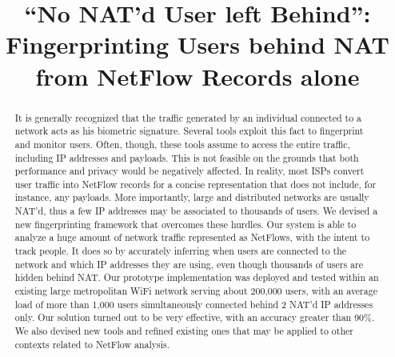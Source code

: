 \documentclass[10pt,conference,compsocconf,letterpaper]{IEEEtran}
\begin{document}
\newtheorem{definition}{Definition}
\newcommand{\nfr}[0]{\textit{nfr}}
\newcommand{\netport}[0]{}
\newcommand{\fkey}[0]{\ensuremath{f_{\textit{key}}}}

\renewenvironment{description}[1][10pt]
  {\list{}{\labelwidth=0pt \leftmargin=#1
   \let\makelabel\descriptionlabel}}
  {\endlist}

\author{
}

\title{``No NAT'd User left Behind'': Fingerprinting Users behind NAT from NetFlow Records alone}

\maketitle
\begin{abstract}
  It is generally recognized that the traffic generated by an
  individual connected to a network acts as his biometric signature.
  Several tools exploit this fact to fingerprint and monitor users.
  Often, though, these tools assume to access the entire
  traffic, including IP addresses and payloads. This is not feasible 
  on the grounds that both performance and privacy would be negatively affected.
  In reality, most ISPs
  convert user traffic into NetFlow records for a concise
  representation that does not include, for instance, any
  payloads. More importantly, large and distributed networks are usually
  NAT'd, thus a few IP addresses may be associated to thousands of
  users.
  We devised a new fingerprinting framework that overcomes these
  hurdles. Our system is able to analyze a huge amount of network traffic
  represented as NetFlows, with the intent to track people. It does so by accurately 
  inferring when users are connected to the network and which IP addresses they are using,  
  even though thousands of users are hidden behind NAT. Our prototype
  implementation was deployed and tested within an existing large
  metropolitan WiFi network serving about 200,000 users, with an average load of more than 1,000 users simultaneously connected behind 2 NAT'd IP addresses only.  Our solution
  turned out to be very effective, with an accuracy greater than
  90\%.  We also devised new tools and refined existing ones that may
  be applied to other contexts related to NetFlow analysis.

\end{abstract}
\end{document}
